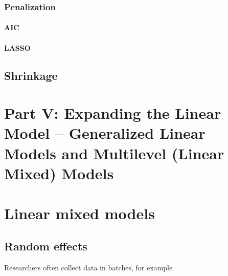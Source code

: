 \documentclass[]{book}
\begin{document}
\hypertarget{penalization}{%
\subsection{Penalization}\label{penalization}}

\hypertarget{aic}{%
\subsubsection{AIC}\label{aic}}

\hypertarget{lasso}{%
\subsubsection{LASSO}\label{lasso}}

\hypertarget{shrinkage}{%
\section{Shrinkage}\label{shrinkage}}

\hypertarget{part-v-expanding-the-linear-model-generalized-linear-models-and-multilevel-linear-mixed-models}{%
\chapter*{Part V: Expanding the Linear Model -- Generalized Linear Models and Multilevel (Linear Mixed) Models}\label{part-v-expanding-the-linear-model-generalized-linear-models-and-multilevel-linear-mixed-models}}

\hypertarget{linear-mixed-models}{%
\chapter{Linear mixed models}\label{linear-mixed-models}}

\hypertarget{random-effects}{%
\section{Random effects}\label{random-effects}}

Researchers often collect data in batches, for example
\end{document}
